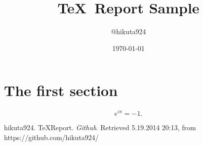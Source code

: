 
\title{\TeX\ Report Sample}
\author{@hikuta924}
\date{\today}

\maketitle

\section{The first section}
\begin{equation}
	e^{i \pi} = -1.
\end{equation}



\begin{thebibliography}{AAA999}
     hikuta924. TeXReport. {\em Github}. Retrieved 5.19.2014 20:13, from https://github.com/hikuta924/
\end{thebibliography}

